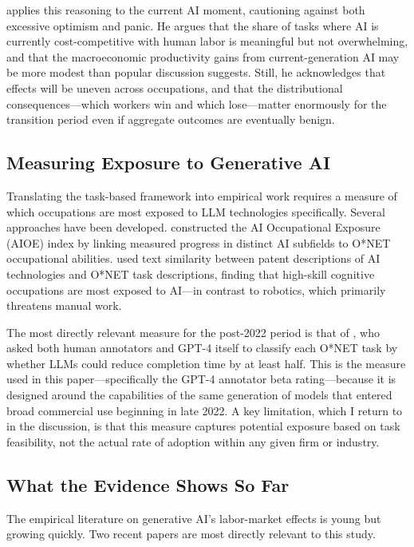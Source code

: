 \documentclass[11pt]{article}
\begin{document}
\textcite{acemoglu2024simple} applies this reasoning to the current AI moment, cautioning against both excessive optimism and panic. He argues that the share of tasks where AI is currently cost-competitive with human labor is meaningful but not overwhelming, and that the macroeconomic productivity gains from current-generation AI may be more modest than popular discussion suggests. Still, he acknowledges that effects will be uneven across occupations, and that the distributional consequences---which workers win and which lose---matter enormously for the transition period even if aggregate outcomes are eventually benign.

\subsection{Measuring Exposure to Generative AI}

Translating the task-based framework into empirical work requires a measure of which occupations are most exposed to LLM technologies specifically. Several approaches have been developed. \textcite{felten2021aioe} constructed the AI Occupational Exposure (AIOE) index by linking measured progress in distinct AI subfields to O*NET occupational abilities. \textcite{webb2020impact} used text similarity between patent descriptions of AI technologies and O*NET task descriptions, finding that high-skill cognitive occupations are most exposed to AI---in contrast to robotics, which primarily threatens manual work.

The most directly relevant measure for the post-2022 period is that of \textcite{eloundou2024gpts}, who asked both human annotators and GPT-4 itself to classify each O*NET task by whether LLMs could reduce completion time by at least half. This is the measure used in this paper---specifically the GPT-4 annotator beta rating---because it is designed around the capabilities of the same generation of models that entered broad commercial use beginning in late 2022. A key limitation, which I return to in the discussion, is that this measure captures potential exposure based on task feasibility, not the actual rate of adoption within any given firm or industry.

\subsection{What the Evidence Shows So Far}

The empirical literature on generative AI's labor-market effects is young but growing quickly. Two recent papers are most directly relevant to this study.
\end{document}

